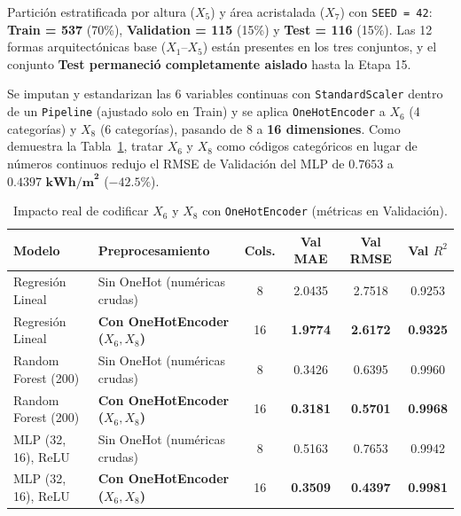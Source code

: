 \documentclass[11pt,a4paper]{article}
\begin{document}
\begin{description}[leftmargin=0.8cm, style=nextline, itemsep=6pt]
    \item[Etapa 06 — Separación experimental:] Partición estratificada por altura ($X_5$) y área acristalada ($X_7$) con \texttt{SEED = 42}: \textbf{Train = 537} (70\%), \textbf{Validation = 115} (15\%) y \textbf{Test = 116} (15\%). Las 12 formas arquitectónicas base ($X_1$--$X_5$) están presentes en los tres conjuntos, y el conjunto \textbf{Test permaneció completamente aislado} hasta la Etapa 15.
    \item[Etapa 07 — Preprocesamiento y efecto de \texttt{OneHotEncoder}:] Se imputan y estandarizan las 6 variables continuas con \texttt{StandardScaler} dentro de un \texttt{Pipeline} (ajustado solo en Train) y se aplica \texttt{OneHotEncoder} a $X_6$ (4 categorías) y $X_8$ (6 categorías), pasando de 8 a \textbf{16 dimensiones}. Como demuestra la Tabla~\ref{tab:onehot}, tratar $X_6$ y $X_8$ como códigos categóricos en lugar de números continuos redujo el RMSE de Validación del MLP de $0.7653$ a $\mathbf{0.4397\text{ kWh/m}^2}$ ($-42.5\%$).
\end{description}

\begin{table}[H]
\centering
\caption{Impacto real de codificar $X_6$ y $X_8$ con \texttt{OneHotEncoder} (métricas en Validación).}
\label{tab:onehot}
\small
\begin{tabular}{llcccc}
\toprule
\textbf{Modelo} & \textbf{Preprocesamiento} & \textbf{Cols.} & \textbf{Val MAE} & \textbf{Val RMSE} & \textbf{Val $R^2$} \\
\midrule
Regresión Lineal & Sin OneHot (numéricas crudas) & 8 & 2.0435 & 2.7518 & 0.9253 \\
Regresión Lineal & \textbf{Con OneHotEncoder ($X_6, X_8$)} & 16 & \textbf{1.9774} & \textbf{2.6172} & \textbf{0.9325} \\
\midrule
Random Forest (200) & Sin OneHot (numéricas crudas) & 8 & 0.3426 & 0.6395 & 0.9960 \\
Random Forest (200) & \textbf{Con OneHotEncoder ($X_6, X_8$)} & 16 & \textbf{0.3181} & \textbf{0.5701} & \textbf{0.9968} \\
\midrule
MLP (32, 16), ReLU & Sin OneHot (numéricas crudas) & 8 & 0.5163 & 0.7653 & 0.9942 \\
MLP (32, 16), ReLU & \textbf{Con OneHotEncoder ($X_6, X_8$)} & 16 & \textbf{0.3509} & \textbf{0.4397} & \textbf{0.9981} \\
\bottomrule
\end{tabular}
\end{table}
\end{document}

